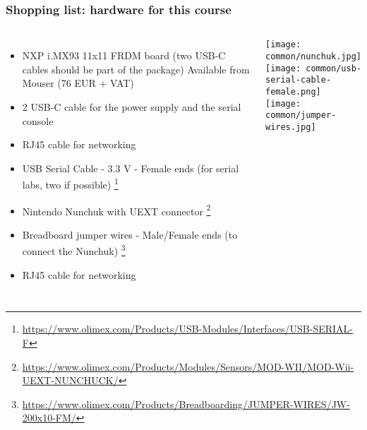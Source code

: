 \begin{frame}
\frametitle{Shopping list: hardware for this course}
  \begin{columns}
    \footnotesize
    \begin{itemize}
      \item NXP i.MX93 11x11 FRDM board (two USB-C cables should be part of the package)
        Available from Mouser (76 EUR + VAT)
      \item 2 USB-C cable for the power supply and the serial console
      \item RJ45 cable for networking
      \item USB Serial Cable - 3.3 V - Female ends (for serial labs, two if possible)
            \footnote{\tiny \url{https://www.olimex.com/Products/USB-Modules/Interfaces/USB-SERIAL-F}}
      \item Nintendo Nunchuk with UEXT connector
            \footnote{\tiny \url{https://www.olimex.com/Products/Modules/Sensors/MOD-WII/MOD-Wii-UEXT-NUNCHUCK/}}
      \item Breadboard jumper wires - Male/Female ends (to connect the Nunchuk)
            \footnote{\tiny \url{https://www.olimex.com/Products/Breadboarding/JUMPER-WIRES/JW-200x10-FM/}}
      \item RJ45 cable for networking
    \end{itemize}
    \texttt{[image: common/nunchuk.jpg]} \\
    \texttt{[image: common/usb-serial-cable-female.png]} \\
    \texttt{[image: common/jumper-wires.jpg]}
  \end{columns}
\end{frame}
